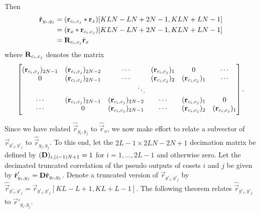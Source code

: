 \documentclass[a4paper, openany, oneside]{memoir}
\begin{document}
Then
\begin{align*}
    \hat{\boldsymbol{\mathbf{r}}}_{y_i,y_j}
    &= (\boldsymbol{\mathbf{r}}_{c_i,c_j} \ast \boldsymbol{\mathbf{r}}_x)[KLN-LN+2N-1,KLN+LN-1]\\
    &= (\boldsymbol{\mathbf{r}}_x \ast \boldsymbol{\mathbf{r}}_{c_i,c_j})[KLN-LN+2N-1,KLN+LN-1] \\
    &= \boldsymbol{\mathbf{R}}_{c_i,c_j} \hat{\boldsymbol{\mathbf{r}}}_x
\end{align*}
where $\boldsymbol{\mathbf{R}}_{c_i,c_j}$ denotes the matrix
\begin{align*}
    \begin{bmatrix}
        (\vec{r}_{c_i,c_j})_{2N-1} & (\vec{r}_{c_i,c_j})_{2N-2} & \cdots &(\vec{r}_{c_i,c_j})_{1} & 0 & \cdots  \\
        0 & (\vec{r}_{c_i,c_j})_{2N-1} & \cdots & (\vec{r}_{c_i,c_j})_{2} & (\vec{r}_{c_i,c_j})_{1} & \cdots \\
        && \multicolumn{2}{c}{\ddots} \\
        \cdots & (\vec{r}_{c_i,c_j})_{2N-1} & (\vec{r}_{c_i,c_j})_{2N-2} & \cdots & (\vec{r}_{c_i,c_j})_{1} & 0 \\
        \cdots & 0 & (\vec{r}_{c_i,c_j})_{2N-1} & \cdots &(\vec{r}_{c_i,c_j})_{2} & (\vec{r}_{c_i,c_j})_{1} 
    \end{bmatrix}.
\end{align*}

Since we have related $\hat{\vec{r}}_{y_i,y_j}$ to $\hat{\vec{r}}_x$, we now make effort to relate a subvector of $\vec{r}_{y'_i,y'_j}$ to $\hat{\vec{r}}_{y_i,y_j}$. To this end, let the $2L-1\times 2LN-2N+1$ decimation matrix be defined by $(\boldsymbol{\mathbf{D}})_{i,(i-1)N+1} = 1$ for $i=1,\ldots,2L-1$ and otherwise zero. Let the decimated truncated correlation of the pseudo outputs of cosets $i$ and $j$ be given by $\hat{\boldsymbol{\mathbf{r}}}'_{y_i,y_j} = \boldsymbol{\mathbf{D}} \hat{\boldsymbol{\mathbf{r}}}_{y_i,y_j}$. Denote a truncated version of $\vec{r}_{y'_i,y'_j}$ by $\hat{\vec{r}}_{y'_i,y'_j}=\vec{r}_{y'_i,y'_j}[KL-L+1,KL+L-1]$. The following theorem relates $\hat{\vec{r}}_{y'_i,y'_j}$ to $\hat{\vec{r}}'_{y_i,y_j}$.
\end{document}
